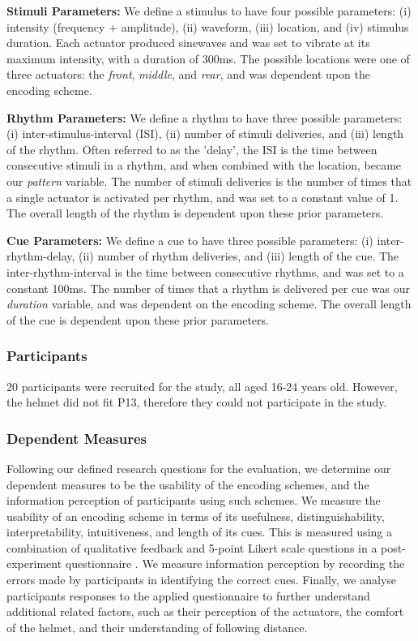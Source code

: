 \documentclass{mpaper}
\begin{document}
\textbf{Stimuli Parameters:} We define a stimulus to have four possible parameters: (i) intensity (frequency + amplitude), (ii) waveform, (iii) location, and (iv) stimulus duration. Each actuator produced sinewaves and was set to vibrate at its maximum intensity, with a duration of 300ms. The possible locations were one of three actuators: the \textit{front}, \textit{middle}, and \textit{rear}, and was dependent upon the encoding scheme.

\textbf{Rhythm Parameters:} We define a rhythm to have three possible parameters: (i) inter-stimulus-interval (ISI), (ii) number of stimuli deliveries, and (iii) length of the rhythm. Often referred to as the 'delay', the ISI is the time between consecutive stimuli in a rhythm, and when combined with the location, became our \textit{pattern} variable. The number of stimuli deliveries is the number of times that a single actuator is activated per rhythm, and was set to a constant value of 1. The overall length of the rhythm is dependent upon these prior parameters.

\textbf{Cue Parameters:} We define a cue to have three possible parameters: (i) inter-rhythm-delay, (ii) number of rhythm deliveries, and (iii) length of the cue. The inter-rhythm-interval is the time between consecutive rhythms, and was set to a constant 100ms. The number of times that a rhythm is delivered per cue was our \textit{duration} variable, and was dependent on the encoding scheme. The overall length of the cue is dependent upon these prior parameters.


\subsubsection{Participants}
20 participants were recruited for the study, all aged 16-24 years old. However, the helmet did not fit P13, therefore they could not participate in the study.


\subsubsection{Dependent Measures}
Following our defined research questions for the evaluation, we determine our dependent measures to be the usability of the encoding schemes, and the information perception of participants using such schemes. We measure the usability of an encoding scheme in terms of its usefulness, distinguishability, interpretability, intuitiveness, and length of its cues. This is measured using a combination of qualitative feedback and 5-point Likert scale questions in a post-experiment questionnaire \cite{joshi2015likert}. We measure information perception by recording the errors made by participants in identifying the correct cues. Finally, we analyse participants responses to the applied questionnaire to further understand additional related factors, such as their perception of the actuators, the comfort of the helmet, and their understanding of following distance.
\end{document}
